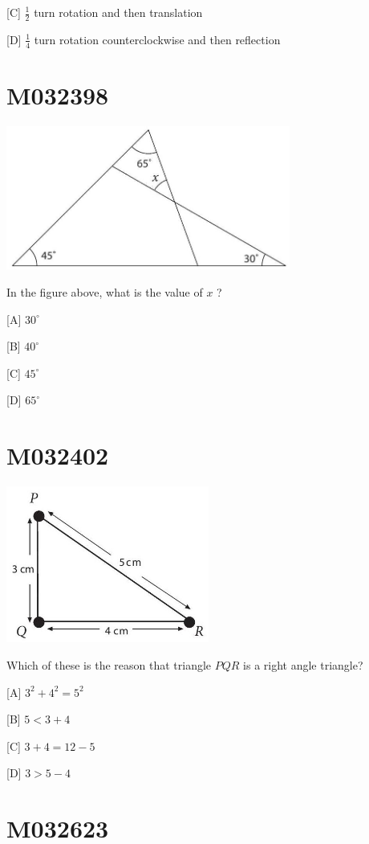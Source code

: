 \documentclass[12pt]{article}
\begin{document}
[C] $\frac{1}{2}$ turn rotation and then translation

[D] $\frac{1}{4}$ turn rotation counterclockwise and then reflection

\newpage
\section*{M032398}


\includegraphics[max width=0.7\textwidth]{2024_02_20_828ebc9d68bcc1fbb223g-56}


In the figure above, what is the value of $x$ ?

[A] $30^{\circ}$

[B] $40^{\circ}$

[C] $45^{\circ}$

[D] $65^{\circ}$


\newpage
\section*{M032402}


\includegraphics[max width=0.5\textwidth]{2024_02_20_828ebc9d68bcc1fbb223g-57}


Which of these is the reason that triangle $P Q R$ is a right angle triangle?

[A] $3^{2}+4^{2}=5^{2}$

[B] $5<3+4$

[C] $3+4=12-5$

[D] $3>5-4$

\newpage
\section*{M032623}
\end{document}

